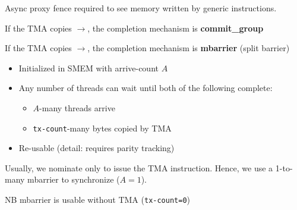 \begin{minipage}[t]{0.48\textwidth}\fixminipage
{}

Async proxy fence required to see memory written by generic instructions.


If the TMA copies $\to$, the completion mechanism is \textbf{commit\_group}

If the TMA copies $\to$, the completion mechanism is \textbf{mbarrier} (split barrier)

\begin{itemize}
  \item Initialized in SMEM with arrive-count $A$
  \item Any number of threads can wait until both of the following complete:
  \begin{itemize}
    \item $A$-many threads arrive
    \item \texttt{tx-count}-many bytes copied by TMA
  \end{itemize}
  \item Re-usable (detail: requires parity tracking)
\end{itemize}
Usually, we nominate only  to issue the TMA instruction.
Hence, we use a 1-to-many mbarrier to synchronize ($A = 1$).

NB mbarrier is usable without TMA (\texttt{tx-count=0})

\end{minipage}
\newpage
{}

